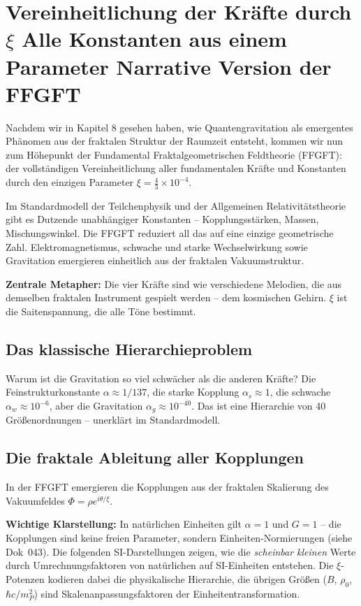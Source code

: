 \chapter{Vereinheitlichung der Kräfte durch \(\xi\)  Alle Konstanten aus einem Parameter  Narrative Version der FFGFT}


	
	Nachdem wir in Kapitel 8 gesehen haben, wie Quantengravitation als emergentes Phänomen aus der fraktalen Struktur der Raumzeit entsteht, kommen wir nun zum Höhepunkt der Fundamental Fraktalgeometrischen Feldtheorie (FFGFT): der vollständigen Vereinheitlichung aller fundamentalen Kräfte und Konstanten durch den einzigen Parameter \(\xi = \frac{4}{3} \times 10^{-4}\).
	
	Im Standardmodell der Teilchenphysik und der Allgemeinen Relativitätstheorie gibt es Dutzende unabhängiger Konstanten – Kopplungsstärken, Massen, Mischungswinkel. Die FFGFT reduziert all das auf eine einzige geometrische Zahl. Elektromagnetismus, schwache und starke Wechselwirkung sowie Gravitation emergieren einheitlich aus der fraktalen Vakuumstruktur.
	
	\textbf{Zentrale Metapher:} Die vier Kräfte sind wie verschiedene Melodien, die aus demselben fraktalen Instrument gespielt werden – dem kosmischen Gehirn. \(\xi\) ist die Saitenspannung, die alle Töne bestimmt.
	
	\section{Das klassische Hierarchieproblem}
	
	Warum ist die Gravitation so viel schwächer als die anderen Kräfte? Die Feinstrukturkonstante \(\alpha \approx 1/137\), die starke Kopplung \(\alpha_s \approx 1\), die schwache \(\alpha_w \approx 10^{-6}\), aber die Gravitation \(\alpha_g \approx 10^{-40}\). Das ist eine Hierarchie von 40 Größenordnungen – unerklärt im Standardmodell.
	
	\section{Die fraktale Ableitung aller Kopplungen}
	
	In der FFGFT emergieren die Kopplungen aus der fraktalen Skalierung des Vakuumfeldes \(\Phi = \rho e^{i \theta / \xi}\).
	
	\textbf{Wichtige Klarstellung:} In natürlichen Einheiten gilt \(\alpha = 1\) und \(G = 1\) -- die Kopplungen sind keine freien Parameter, sondern Einheiten-Normierungen (siehe Dok~043). Die folgenden SI-Darstellungen zeigen, wie die \textit{scheinbar kleinen} Werte durch Umrechnungsfaktoren von natürlichen auf SI-Einheiten entstehen. Die \(\xi\)-Potenzen kodieren dabei die physikalische Hierarchie, die übrigen Größen (\(B\), \(\rho_0\), \(\hbar c / m_P^2\)) sind Skalenanpassungsfaktoren der Einheitentransformation.
	
